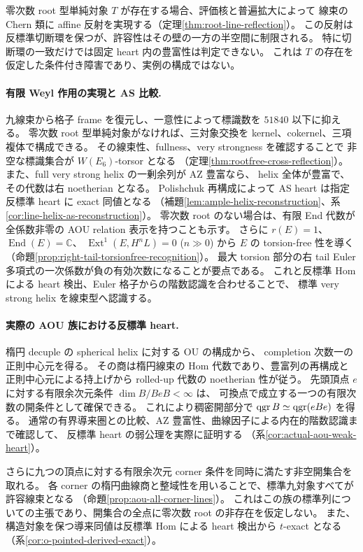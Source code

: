 \documentclass[11pt,a4paper]{ltjsarticle}
\theoremstyle{definition}\newtheorem{remark}[theorem]{注意}
\newcommand{\Ext}{\operatorname{Ext}}\newcommand{\Extop}{\operatorname{Ext}}
\newcommand{\End}{\operatorname{End}}\newcommand{\RHom}{\operatorname{RHom}}
\begin{document}
零次数 root 型単純対象 $T$ が存在する場合、評価核と普遍拡大によって
線束の Chern 類に affine 反射を実現する（定理\ref{thm:root-line-reflection}）。
この反射は反標準切断環を保つが、許容性はその壁の一方の半空間に制限される。
特に切断環の一致だけでは固定 heart 内の豊富性は判定できない。
これは $T$ の存在を仮定した条件付き障害であり、実例の構成ではない。

\paragraph{有限 Weyl 作用の実現と AS 比較.}
九線束から格子 frame を復元し、一意性によって標識数を $51840$ 以下に抑える。
零次数 root 型単純対象がなければ、三対象交換を kernel、cokernel、三項複体で構成できる。
その線束性、fullness、very strongness を確認することで
非空な標識集合が $W(E_6)$-torsor となる
（定理\ref{thm:rootfree-cross-reflection}）。
また、full very strong helix の一剰余列が AZ 豊富なら、
helix 全体が豊富で、その代数は右 noetherian となる。
Polishchuk 再構成によって AS heart は指定反標準 heart に exact 同値となる
（補題\ref{lem:ample-helix-reconstruction}、系\ref{cor:line-helix-as-reconstruction}）。
零次数 root のない場合は、有限 End 代数が全係数非零の AOU relation 表示を持つことも示す。
さらに $r(E)=1$、$\End(E)=\mathbb C$、
$\Ext^1(E,H^nL)=0$ ($n\gg0$) から $E$ の torsion-free 性を導く
（命題\ref{prop:right-tail-torsionfree-recognition}）。
最大 torsion 部分の右 tail Euler 多項式の一次係数が負の有効次数になることが要点である。
これと反標準 Hom による heart 検出、Euler 格子からの階数認識を合わせることで、
標準 very strong helix を線束型へ認識する。

\paragraph{実際の AOU 族における反標準 heart.}
楕円 decuple の spherical helix に対する OU の構成から、
completion 次数一の正則中心元を得る。
その商は楕円線束の Hom 代数であり、豊富列の再構成と正則中心元による持上げから
rolled-up 代数の noetherian 性が従う。
先頭頂点 $e$ に対する有限余次元条件 $\dim B/BeB<\infty$ は、
可換点で成立する一つの有限次数の開条件として確保できる。
これにより稠密開部分で
$\operatorname{qgr} B\simeq\operatorname{qgr}(eBe)$ を得る。
通常の有界導来圏との比較、AZ 豊富性、曲線因子による内在的階数認識まで確認して、
反標準 heart の弱公理を実際に証明する
（系\ref{cor:actual-aou-weak-heart}）。

さらに九つの頂点に対する有限余次元 corner 条件を同時に満たす非空開集合を取れる。
各 corner の楕円曲線商と整域性を用いることで、標準九対象すべてが許容線束となる
（命題\ref{prop:aou-all-corner-lines}）。
これはこの族の標準列についての主張であり、開集合の全点に零次数 root の非存在を仮定しない。
また、構造対象を保つ導来同値は反標準 Hom による heart 検出から $t$-exact となる
（系\ref{cor:o-pointed-derived-exact}）。
\end{document}
